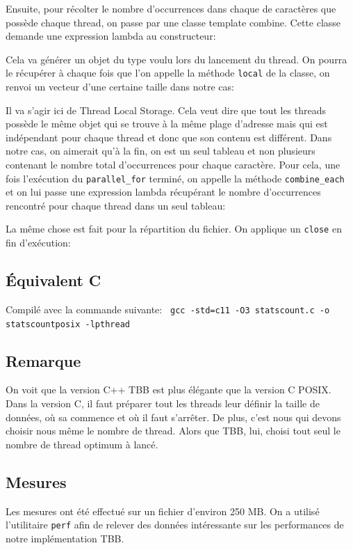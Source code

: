 \documentclass[10pt,a4paper]{article}
\begin{document}
Ensuite, pour récolter le nombre d'occurrences dans chaque de caractères que possède chaque thread, on passe par une classe template combine. Cette classe demande une expression lambda au constructeur:

Cela va générer un objet du type voulu lors du lancement du thread. On pourra le récupérer à chaque fois que l'on appelle la méthode \texttt{local} de la classe, on renvoi un vecteur d'une certaine taille dans notre cas:

Il va s'agir ici de Thread Local Storage. Cela veut dire que tout les threads possède le même objet qui se trouve à la même plage d'adresse mais qui est indépendant pour chaque thread et donc que son contenu est différent. Dans notre cas, on aimerait qu'à la fin, on est un seul tableau et non plusieurs contenant le nombre total d’occurrences pour chaque caractère. Pour cela, une fois l'exécution du \texttt{parallel\_for} terminé, on appelle la méthode \texttt{combine\_each} et on lui passe  une expression lambda récupérant le nombre d'occurrences rencontré pour chaque thread dans un seul tableau:

La même chose est fait pour la répartition du fichier. On applique un \texttt{close} en fin d'exécution:


\newpage

\subsection{Équivalent C}

Compilé avec la commande suivante: \texttt{ gcc -std=c11 -O3 statscount.c -o statscountposix -lpthread}



\subsection{Remarque}
On voit que la version C++ TBB est plus élégante que la version C POSIX. Dans la version C, il faut préparer tout les threads leur définir la taille de données, où sa commence et où il faut s'arrêter. De plus, c'est nous qui devons choisir nous même le nombre de thread. Alors que TBB, lui, choisi tout seul le nombre de thread optimum à lancé.

\subsection{Mesures}
Les mesures ont été effectué sur un fichier d'environ 250 MB. On a utilisé l'utilitaire \texttt{perf} afin de relever des données intéressante sur les performances de notre implémentation TBB.
\end{document}
